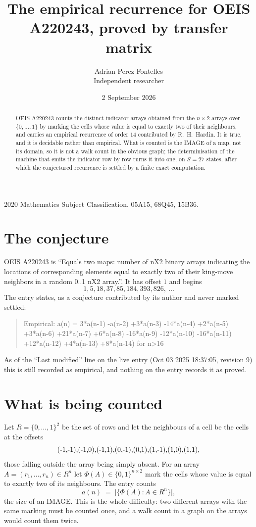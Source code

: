 \documentclass[11pt,a4paper]{article}
\title{The empirical recurrence for OEIS A220243, proved by transfer matrix}
\author{Adrian Perez Fontelles\\ \small Independent researcher}
\date{2 September 2026}
\theoremstyle{plain}
\theoremstyle{definition}
\begin{document}
\maketitle

\begin{abstract}
OEIS A220243 counts the distinct indicator arrays obtained from the $n\times2$ arrays over
$\{0,\dots,1\}$ by marking the cells whose value is equal to exactly two of their neighbours, and carries an
empirical recurrence of order $14$ contributed by R.~H.~Hardin. It is true, and it is
decidable rather than empirical. What is counted is the IMAGE of a map, not its domain, so it
is not a walk count in the obvious graph; the determinisation of the machine that emits the
indicator row by row turns it into one, on $S=27$ states, after which the conjectured
recurrence is settled by a finite exact computation.
\end{abstract}

\noindent\small 2020 Mathematics Subject Classification. 05A15, 68Q45, 15B36.\normalsize

\section{The conjecture}

OEIS A220243 is ``Equals two maps: number of nX2 binary arrays indicating the locations of corresponding elements equal to exactly two of their king-move neighbors in a random 0..1 nX2 array.''. It has offset $1$ and begins
\[
1, 5, 18, 37, 85, 184, 393, 826,\ \dots
\]
The entry states, as a conjecture contributed by its author and never marked settled:
\begin{quote}
Empirical: a(n) = 3*a(n-1) -a(n-2) +3*a(n-3) -14*a(n-4) +2*a(n-5) +3*a(n-6) +21*a(n-7) +6*a(n-8) -16*a(n-9) -12*a(n-10) -16*a(n-11) +12*a(n-12) +4*a(n-13) +8*a(n-14) for n>16
\end{quote}
As of the ``Last modified'' line on the live entry (Oct 03 2025 18:37:05, revision 9) this is still
recorded as empirical, and nothing on the entry records it as proved.

\section{What is being counted}

Let $R=\{0,\dots,1\}^{2}$ be the set of rows and let the neighbours of a cell be the
cells at the offsets
\[
$(-1,-1)$, $(-1,0)$, $(-1,1)$, $(0,-1)$, $(0,1)$, $(1,-1)$, $(1,0)$, $(1,1)$,
\]
those falling outside the array being simply absent. For an array
$A=(r_1,\dots,r_n)\in R^n$ let $\Phi(A)\in\{0,1\}^{n\times2}$ mark the cells whose value
is equal to exactly two of its neighbours. The entry counts
\[
a(n)\;=\;\bigl|\{\Phi(A):A\in R^n\}\bigr| ,
\]
the size of an IMAGE. This is the whole difficulty: two different arrays with the same marking
must be counted once, and a walk count in a graph on the arrays would count them twice.
\end{document}
